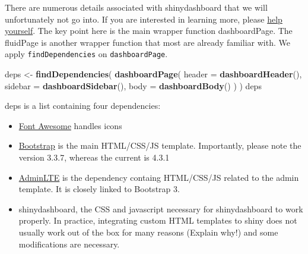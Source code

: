 \documentclass[]{book}
\newenvironment{Shaded}{\begin{snugshade}}{\end{snugshade}}
\newcommand{\DataTypeTok}[1]{\textcolor[rgb]{0.13,0.29,0.53}{#1}}
\newcommand{\KeywordTok}[1]{\textcolor[rgb]{0.13,0.29,0.53}{\textbf{#1}}}
\newcommand{\NormalTok}[1]{#1}
\newcommand{\StringTok}[1]{\textcolor[rgb]{0.31,0.60,0.02}{#1}}
\providecommand{\tightlist}{%
  \setlength{\itemsep}{0pt}\setlength{\parskip}{0pt}}
\begin{document}
There are numerous details associated with shinydashboard that we will unfortunately not go into. If you are interested in learning more, please \href{https://rstudio.github.io/shinydashboard/}{help yourself}. The key point here is the main wrapper function dashboardPage. The fluidPage is another wrapper function that most are already familiar with. We apply \texttt{findDependencies} on \texttt{dashboardPage}.

\begin{Shaded}
\begin{Highlighting}[]
\NormalTok{deps <-}\StringTok{ }\KeywordTok{findDependencies}\NormalTok{(}
  \KeywordTok{dashboardPage}\NormalTok{(}
    \DataTypeTok{header =} \KeywordTok{dashboardHeader}\NormalTok{(), }
    \DataTypeTok{sidebar =} \KeywordTok{dashboardSidebar}\NormalTok{(), }
    \DataTypeTok{body =} \KeywordTok{dashboardBody}\NormalTok{()}
\NormalTok{  )}
\NormalTok{)}
\NormalTok{deps}
\end{Highlighting}
\end{Shaded}

deps is a list containing four dependencies:

\begin{itemize}
\tightlist
\item
  \href{https://fontawesome.com}{Font Awesome} handles icons
\item
  \href{https://getbootstrap.com/docs/3.3/}{Bootstrap} is the main HTML/CSS/JS template. Importantly,
  please note the version 3.3.7, whereas the current is 4.3.1
\item
  \href{https://adminlte.io}{AdminLTE} is the dependency containg HTML/CSS/JS related to the admin template.
  It is closely linked to Bootstrap 3.
\item
  shinydashboard, the CSS and javascript necessary for shinydashboard to work properly. In practice,
  integrating custom HTML templates to shiny does not usually work out of the box for many reasons (Explain why!) and some modifications are necessary.
\end{itemize}
\end{document}

